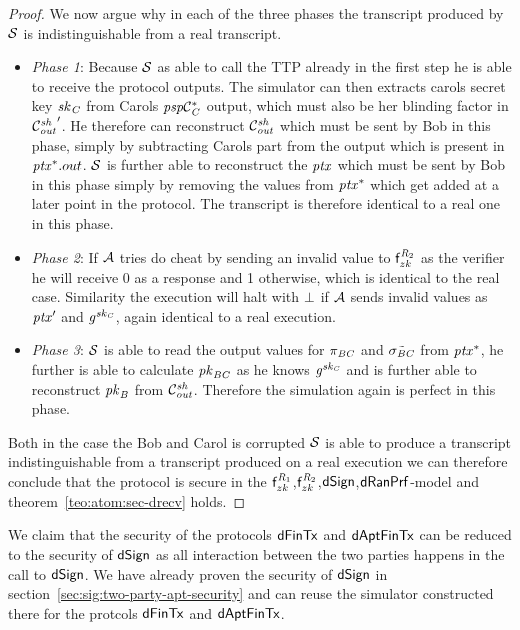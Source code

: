 \begin{proof}
    We now argue why in each of the three phases the transcript produced by $\mathcal{S}$ is indistinguishable from a real transcript.

    \begin{itemize}
        \item \textit{Phase 1}: Because $\mathcal{S}$ as able to call the TTP already in the first step he is able to receive the protocol outputs.
        The simulator can then extracts carols secret key $\mathit{sk}_{\mathit{C}}$ from Carols $\mathit{psp}\mathcal{C}_{\mathit{C}}^*$ output, which must also be her blinding factor in ${\mathcal{C}_{\mathit{out}}^{\mathit{sh}}}'$.
        He therefore can reconstruct $\mathcal{C}_{\mathit{out}}^{\mathit{sh}}$ which must be sent by Bob in this phase, simply by subtracting Carols part from the output which is present in $\mathit{ptx}^*.out$.
        $\mathcal{S}$ is further able to reconstruct the $\mathit{ptx}$ which must be sent by Bob in this phase simply by removing the values from $\mathit{ptx}^*$ which get added at a later point in the protocol.
        The transcript is therefore identical to a real one in this phase.
        \item \textit{Phase 2}: If $\mathcal{A}$ tries do cheat by sending an invalid value to $\mathsf{f}^{\mathit{R}_2}_{zk}$ as the verifier he will receive 0 as a response and 1 otherwise, which is identical to the real case.
        Similarity the execution will halt with $\bot$ if $\mathcal{A}$ sends invalid values as ${\mathit{ptx}}'$ and $\mathit{g}^{\mathit{sk}_{\mathit{C}}}$, again identical to a real execution.
        \item \textit{Phase 3}: $\mathcal{S}$ is able to read the output values for $\pi_{\mathit{B}\mathit{C}}$ and $\tilde{\sigma_{\mathit{B}\mathit{C}}}$ from $\mathit{ptx}^*$, he further is able to calculate $\mathit{pk}_{\mathit{B}\mathit{C}}$ as he knows $\mathit{g}^{\mathit{sk}_{\mathit{C}}}$ and is further able to reconstruct $\mathit{pk}_{\mathit{B}}$ from $\mathcal{C}_{\mathit{out}}^{\mathit{sh}}$.
        Therefore the simulation again is perfect in this phase.
    \end{itemize}

    Both in the case the Bob and Carol is corrupted $\mathcal{S}$ is able to produce a transcript indistinguishable from a transcript produced on a real execution we can therefore conclude that the protocol is secure in the $\mathsf{f}^{\mathit{R}_1}_{zk}$,$\mathsf{f}^{\mathit{R}_2}_{zk}$,$\mathsf{dSign}$,$\mathsf{dRanPrf}$-model and theorem~\ref{teo:atom:sec-drecv} holds.
\end{proof}

We claim that the security of the protocols $\mathsf{dFinTx}$ and $\mathsf{dAptFinTx}$ can be reduced to the security of $\mathsf{dSign}$ as all interaction between the two parties happens in the call to $\mathsf{dSign}$.
We have already proven the security of $\mathsf{dSign}$ in section~\ref{sec:sig:two-party-apt-security} and can reuse the simulator constructed there for the protcols $\mathsf{dFinTx}$ and $\mathsf{dAptFinTx}$.


